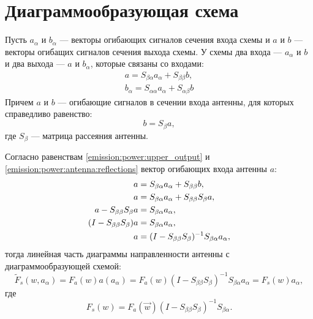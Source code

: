 \chapter{Диаграммообразующая схема}

Пусть $a_\alpha$ и $b_\alpha$ --- векторы огибающих сигналов сечения входа схемы и $a$ и $b$ --- векторы огибащих сигналов сечения выхода схемы. У схемы два входа ---
$a_\alpha$ и $b$ и два выхода --- $a$ и $b_\alpha$, которые связаны со входами:
\begin{gather}
    a        = S_{\beta \alpha} a_\alpha + S_{\beta \beta} b
    \label{emission:power:upper_output}, \\
    b_\alpha = S_{\alpha \alpha} a_\alpha + S_{\alpha \beta} b
    \label{emission:power:lower_output}
\end{gather}
Причем $a$ и $b$ ---  огибающие сигналов в сечении входа антенны, для которых справедливо равенство:
\begin{equation}
    \label{emission:power:antenna:reflections}
    b = S_\beta a ,
\end{equation}
где $S_\beta$ --- матрица рассеяния антенны.

Согласно равенствам \eqref{emission:power:upper_output} и \eqref{emission:power:antenna:reflections} вектор огибающих входа антенны $a$:
\begin{align}
    a & = S_{\beta \alpha} a_\alpha + S_{\beta \beta} b , \notag \\
    a & = S_{\beta \alpha} a_\alpha + S_{\beta \beta} S_\beta a , \notag \\
    a - S_{\beta \beta} S_\beta a & = S_{\beta \alpha} a_\alpha , \notag \\
    ( I - S_{\beta \beta} S_\beta ) a & = S_{\beta \alpha} a_\alpha , \notag \\
    a & = ( I - S_{\beta \beta} S_\beta )^{-1} S_{\beta \alpha} a_\alpha , \label{emission:power:antenna:input}
\end{align}
тогда линейная часть диаграммы направленности антенны с диаграммообразующей схемой:
\[
    \widetilde{F}_s(w, a_\alpha)
    = F_a(w) a(a_\alpha)
    = F_a(w) ( I - S_{\beta \beta} S_\beta )^{-1} S_{\beta \alpha} a_\alpha
    = F_s(w) a_\alpha,
\]
где
\[
    F_s(w) = F_a(\vec{w}) ( I - S_{\beta \beta} S_\beta )^{-1} S_{\beta \alpha} .
\]

